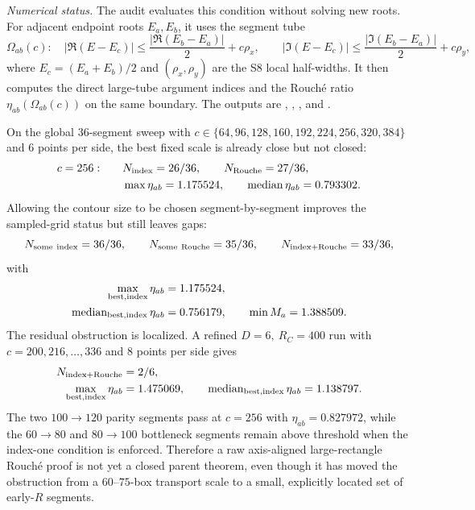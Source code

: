 \documentclass[aps,prd,onecolumn,notitlepage,nofootinbib,superscriptaddress,11pt,floatfix]{revtex4-2}
\begin{document}
\emph{Numerical status.}
The audit  evaluates this condition without solving new roots.  For adjacent endpoint roots \(E_a,E_b\), it uses the segment tube
\[
\Omega_{ab}(c):
\quad
|\Re(E-E_c)|\le \frac{|\Re(E_b-E_a)|}{2}+c\rho_x,
\qquad
|\Im(E-E_c)|\le \frac{|\Im(E_b-E_a)|}{2}+c\rho_y,
\]
where \(E_c=(E_a+E_b)/2\) and \((\rho_x,\rho_y)\) are the S8 local half-widths.  It then computes the direct large-tube argument indices and the Rouché ratio \(\eta_{ab}(\Omega_{ab}(c))\) on the same boundary.  The outputs are , , , and .

On the global \(36\)-segment sweep with \(c\in\{64,96,128,160,192,224,256,320,384\}\) and \(6\) points per side, the best fixed scale is already close but not closed:
\[
\begin{aligned}
c=256:\qquad
&N_{\rm index}=26/36,\qquad
N_{\rm Rouche}=27/36,\\
&\max\eta_{ab}=1.175524,\qquad
\operatorname{median}\eta_{ab}=0.793302.
\end{aligned}
\]
Allowing the contour size to be chosen segment-by-segment improves the sampled-grid status but still leaves gaps:
\[
N_{\rm some\ index}=36/36,\qquad
N_{\rm some\ Rouche}=35/36,\qquad
N_{\rm index+Rouche}=33/36,
\]
with
\[
\begin{aligned}
\max_{\rm best,index}\eta_{ab}&=1.175524,\\
\operatorname{median}_{\rm best,index}\eta_{ab}&=0.756179,
\qquad
\min M_a=1.388509.
\end{aligned}
\]
The residual obstruction is localized.  A refined \(D=6,\ R_C=400\) run with \(c=200,216,\ldots,336\) and \(8\) points per side gives
\[
\begin{aligned}
N_{\rm index+Rouche}&=2/6,\\
\max_{\rm best,index}\eta_{ab}&=1.475069,\qquad
\operatorname{median}_{\rm best,index}\eta_{ab}=1.138797.
\end{aligned}
\]
The two \(100\to120\) parity segments pass at \(c=256\) with \(\eta_{ab}=0.827972\), while the \(60\to80\) and \(80\to100\) bottleneck segments remain above threshold when the index-one condition is enforced.  Therefore a raw axis-aligned large-rectangle Rouché proof is not yet a closed parent theorem, even though it has moved the obstruction from a \(60\)--\(75\)-box transport scale to a small, explicitly located set of early-\(R\) segments.
\end{document}
